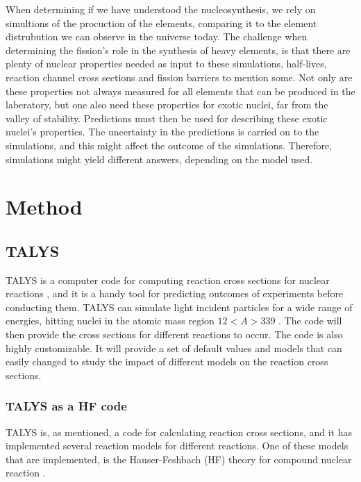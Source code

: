 \documentclass[]{article}
\begin{document}
\par 
\vspace{3mm}

 \noindent When determining if we have understood the nucleosynthesis, we rely on simultions of the procuction of the elements, comparing it to the element distrubution we can observe in the universe today.  The challenge when determining the fission's role in the synthesis of heavy elements, is that there are plenty of nuclear properties needed as input to these simulations, half-lives, reaction channel cross sections and fission barriers to mention some. Not only are these properties not always measured for all elements that can be produced in the laberatory, but one also need these properties for exotic nuclei, far from the valley of stability. Predictions must then be used for describing these exotic nuclei's properties. The uncertainty in the predictions is carried on to the simulations, and this might affect the outcome of the simulations. Therefore, simulations might yield different answers, depending on the model used. 

\section{Method}

\subsection{TALYS}

TALYS is a computer code for computing reaction cross sections for nuclear reactions \cite{TALYSmanual}, and it is a handy tool for predicting outcomes of experiments before conducting them. TALYS can simulate light incident particles for a wide range of energies, hitting nuclei in the atomic mass region $12<A>339$ \cite{TALYSmanual}. The code will then provide the cross sections for different reactions to occur. The code is also highly customizable. It will provide a set of default values and models that can easily changed to study the impact of different models on the reaction cross sections.

\subsubsection{TALYS as a HF code}
TALYS is, as mentioned, a code for calculating reaction cross sections, and it has implemented several reaction models for different reactions. One of these models that are implemented, is the Hauser-Feshbach (HF) theory for compound nuclear reaction \cite{TALYSweb}. 
\par 
\vspace{3mm}
\end{document}
